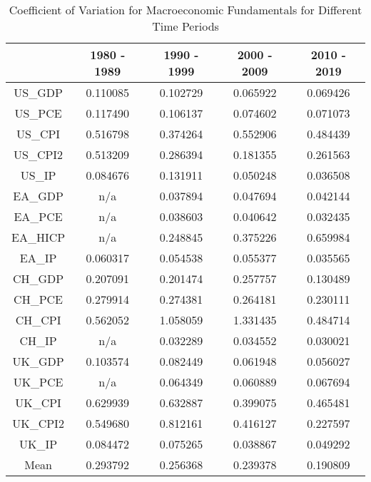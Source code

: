 \documentclass{article}
\begin{document}
\begin{table}[H]
    \centering
    \caption{Coefficient of Variation for Macroeconomic Fundamentals for Different Time Periods}
    \begin{tabular}{ccccc}
        \hline
        {} &  1980 - 1989 &  1990 - 1999 &  2000 - 2009 &  2010 - 2019 \\
        \hline
        US\_GDP  &     0.110085 &     0.102729 &     0.065922 &     0.069426 \\
        US\_PCE  &     0.117490 &     0.106137 &     0.074602 &     0.071073 \\
        US\_CPI  &     0.516798 &     0.374264 &     0.552906 &     0.484439 \\
        US\_CPI2 &     0.513209 &     0.286394 &     0.181355 &     0.261563 \\
        US\_IP   &     0.084676 &     0.131911 &     0.050248 &     0.036508 \\
        EA\_GDP  &     n/a &          0.037894 &     0.047694 &     0.042144 \\
        EA\_PCE  &     n/a &          0.038603 &     0.040642 &     0.032435 \\
        EA\_HICP &     n/a &          0.248845 &     0.375226 &     0.659984 \\
        EA\_IP   &     0.060317 &     0.054538 &     0.055377 &     0.035565 \\
        CH\_GDP  &     0.207091 &     0.201474 &     0.257757 &     0.130489 \\
        CH\_PCE  &     0.279914 &     0.274381 &     0.264181 &     0.230111 \\
        CH\_CPI  &     0.562052 &     1.058059 &     1.331435 &     0.484714 \\
        CH\_IP   &     n/a &          0.032289 &     0.034552 &     0.030021 \\
        UK\_GDP  &     0.103574 &     0.082449 &     0.061948 &     0.056027 \\
        UK\_PCE  &     n/a &          0.064349 &     0.060889 &     0.067694 \\
        UK\_CPI  &     0.629939 &     0.632887 &     0.399075 &     0.465481 \\
        UK\_CPI2 &     0.549680 &     0.812161 &     0.416127 &     0.227597 \\
        UK\_IP   &     0.084472 &     0.075265 &     0.038867 &     0.049292 \\
        Mean    &      0.293792 &     0.256368 &     0.239378 &     0.190809 \\
        \hline
    \end{tabular}
\end{table}
\end{document}
